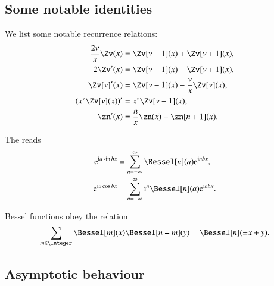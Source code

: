     \subsection{Some notable identities}
    We list some notable recurrence relations:
    \begin{subequations}
        \begin{align}
            \frac{2\nu}{x}\Zv(x) &= \Zv[\nu-1](x) + \Zv[\nu+1](x), \label{eq:derivations:cylinder:recurr_Z_plus}\\
            2\Zv'(x) &= \Zv[\nu-1](x) - \Zv[\nu+1](x),\label{eq:derivations:cylinder:recurr_Z_minus} \\
            \Zv[\nu]'(x) &= \Zv[\nu-1](x) - \frac{\nu}{x}\Zv[\nu](x),\label{eq:derivations:cylinder:recurr_Z_minus_vol2} \\
            \pclosed{x^\nu \Zv[\nu](x)}' &= x^\nu \Zv[\nu-1] (x),\label{eq:derivations:cylinder:der_idk_Z_123} \\
            \zn'(x) &= \frac{n}{x}\zn(x) -\zn[n+1](x).
        \end{align}
    \end{subequations}

    The  reads
    \begin{subequations}\label{eq:cylinder:Jacobi_Anger}
        \begin{align}
            \eu[\im a \sin{bx}]  &= \sum_{n=-\infty}^{\infty} \Bessel[n](a) \eu[\im n bx],\label{eq:cylinder:Jacobi_Anger_sin} \\
            \eu[\im a \cos{bx}]  &= \sum_{n=-\infty}^{\infty} \im^{n}\Bessel[n](a) \eu[\im n bx] \label{eq:cylinder:Jacobi_Anger_cos}.
        \end{align}
    \end{subequations}

    Bessel functions obey the relation
    \begin{equation}\label{eq:cylinder:Bessel_sum_relation}
        \sum_{m\in \Integer} \Bessel[m](x) \Bessel[n\mp m](y) = \Bessel[n](\pm x+y).
    \end{equation}



    \subsection{Asymptotic behaviour}


